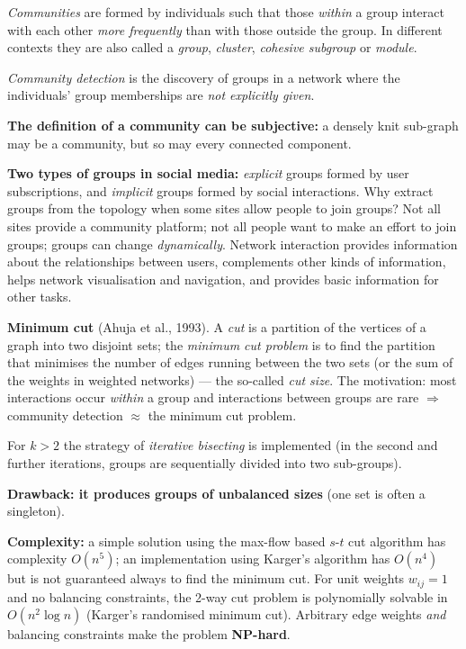 \documentclass[11pt,a4paper]{article}
\theoremstyle{definition}
\begin{document}
\begin{defbox}
\emph{Communities} are formed by individuals such that those \emph{within} a group interact with each
other \emph{more frequently} than with those outside the group. In different contexts they are also
called a \emph{group}, \emph{cluster}, \emph{cohesive subgroup} or \emph{module}.

\emph{Community detection} is the discovery of groups in a network where the individuals' group
memberships are \emph{not explicitly given}.

\textbf{The definition of a community can be subjective:} a densely knit sub-graph may be a community,
but so may every connected component.

\textbf{Two types of groups in social media:} \emph{explicit} groups formed by user subscriptions, and
\emph{implicit} groups formed by social interactions. Why extract groups from the topology when some
sites allow people to join groups? Not all sites provide a community platform; not all people want to
make an effort to join groups; groups can change \emph{dynamically}. Network interaction provides
information about the relationships between users, complements other kinds of information, helps
network visualisation and navigation, and provides basic information for other tasks.
\end{defbox}

\begin{defbox}
\textbf{Minimum cut} (Ahuja et al., 1993). A \emph{cut} is a partition of the vertices of a graph into
two disjoint sets; the \emph{minimum cut problem} is to find the partition that minimises the number of
edges running between the two sets (or the sum of the weights in weighted networks) --- the so-called
\emph{cut size}. The motivation: most interactions occur \emph{within} a group and interactions
between groups are rare $\Rightarrow$ community detection $\approx$ the minimum cut problem.

For $k>2$ the strategy of \emph{iterative bisecting} is implemented (in the second and further
iterations, groups are sequentially divided into two sub-groups).

\textbf{Drawback: it produces groups of unbalanced sizes} (one set is often a singleton).

\textbf{Complexity:} a simple solution using the max-flow based $s$-$t$ cut algorithm has complexity
$O(n^5)$; an implementation using Karger's algorithm has $O(n^4)$ but is not guaranteed always to find
the minimum cut. For unit weights $w_{ij}=1$ and no balancing constraints, the 2-way cut problem is
polynomially solvable in $O(n^2\log n)$ (Karger's randomised minimum cut). Arbitrary edge weights
\emph{and} balancing constraints make the problem \textbf{NP-hard}.
\end{defbox}
\end{document}
